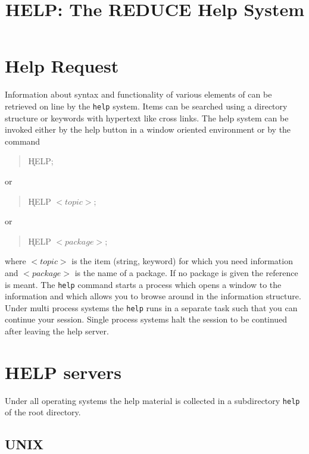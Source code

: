 \title{HELP: The REDUCE Help System}
\author{ }
\date{}


\maketitle


\section{Help Request}

Information about syntax and functionality of various elements
of {\REDUCE}  can be retrieved on line by the {\tt help} system.
Items can be searched using a directory structure or keywords
with hypertext like cross links. The help system can be invoked
either by the help button in a window oriented environment
or by the command

\begin{quote}
    \k{HELP;}
\end{quote}
or
\begin{quote}
    \k{HELP $<topic>$;}
\end{quote}
or
\begin{quote}
    \k{HELP $<package>$;}
\end{quote}

where $<topic>$ is the item (string, keyword) for which you
need information and $<package>$ is the name of a
package. If no package is given the {\REDUCE} reference
is meant.  The {\tt help} command starts a process
which opens a window to the information and which allows
you to browse around in the information structure. Under
multi process systems the {\tt help} runs in a separate
task such that you can continue your {\REDUCE}  session.
Single process systems halt the {\REDUCE}  session to
be continued after leaving the help server.

\section{HELP servers}

Under all operating systems the help material is collected
in a subdirectory {\tt help} of the {\REDUCE} root
directory.

\subsection{UNIX}

